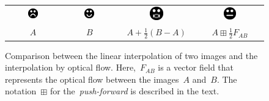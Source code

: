 \documentclass{ipol}
\begin{document}
\begin{figure}[h]
	\begin{center}
		\begin{tabular}{cccc}
			\includegraphics[width=0.2\textwidth]{f/psad.png} &
			\includegraphics[width=0.2\textwidth]{f/phappy.png} &
			\includegraphics[width=0.2\textwidth]{f/psum.png} &
			\includegraphics[width=0.2\textwidth]{f/pnormal.png} \\
			$A$ & $B$ & $A+\frac{1}{2}(B-A)$ &
			$A\boxplus\frac{1}{2}F_{AB}$ \\
		\end{tabular}
	\end{center}
	\caption{Comparison between the linear interpolation of two images and the
	interpolation by optical flow.  Here,~$F_{AB}$ is a vector field that
	represents the optical flow between the images~$A$ and~$B$.  The
	notation~$\boxplus$ for the~\emph{push-forward} is described in the text.
	}
	\label{fig:faces}
\end{figure}
\end{document}
